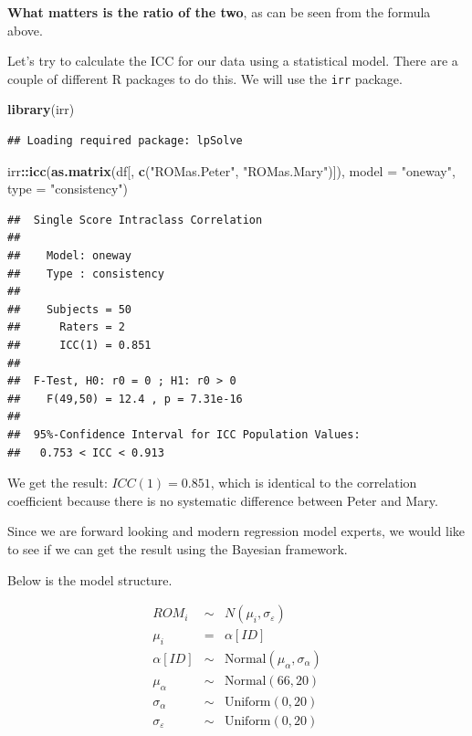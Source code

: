 \documentclass[
]{book}
\newenvironment{Shaded}{\begin{snugshade}}{\end{snugshade}}
\newcommand{\AttributeTok}[1]{\textcolor[rgb]{0.13,0.29,0.53}{#1}}
\newcommand{\FunctionTok}[1]{\textcolor[rgb]{0.13,0.29,0.53}{\textbf{#1}}}
\newcommand{\NormalTok}[1]{#1}
\newcommand{\SpecialCharTok}[1]{\textcolor[rgb]{0.81,0.36,0.00}{\textbf{#1}}}
\newcommand{\StringTok}[1]{\textcolor[rgb]{0.31,0.60,0.02}{#1}}
\begin{document}
\textbf{What matters is the ratio of the two}, as can be seen from the formula above.

Let's try to calculate the ICC for our data using a statistical model. There are a couple of different
R packages to do this. We will use the \texttt{irr} package.

\begin{Shaded}
\begin{Highlighting}[]
\FunctionTok{library}\NormalTok{(irr)}
\end{Highlighting}
\end{Shaded}

\begin{verbatim}
## Loading required package: lpSolve
\end{verbatim}

\begin{Shaded}
\begin{Highlighting}[]
\NormalTok{irr}\SpecialCharTok{::}\FunctionTok{icc}\NormalTok{(}\FunctionTok{as.matrix}\NormalTok{(df[, }\FunctionTok{c}\NormalTok{(}\StringTok{"ROMas.Peter"}\NormalTok{, }\StringTok{"ROMas.Mary"}\NormalTok{)]), }
    \AttributeTok{model =} \StringTok{"oneway"}\NormalTok{, }\AttributeTok{type =} \StringTok{"consistency"}\NormalTok{)}
\end{Highlighting}
\end{Shaded}

\begin{verbatim}
##  Single Score Intraclass Correlation
## 
##    Model: oneway 
##    Type : consistency 
## 
##    Subjects = 50 
##      Raters = 2 
##      ICC(1) = 0.851
## 
##  F-Test, H0: r0 = 0 ; H1: r0 > 0 
##    F(49,50) = 12.4 , p = 7.31e-16 
## 
##  95%-Confidence Interval for ICC Population Values:
##   0.753 < ICC < 0.913
\end{verbatim}

We get the result: \(ICC(1) = 0.851\), which is identical to the correlation coefficient
because there is no systematic difference between Peter and Mary.

Since we are forward looking and modern regression model experts,
we would like to see if we can get the result using the Bayesian
framework.

Below is the model structure.

\[
\begin{array}{rcl}
ROM_i &\sim& N(\mu_i, \sigma_{\varepsilon}) \\
\mu_i &=& \alpha[ID] \\
\alpha[ID] &\sim& \text{Normal}(\mu_{\alpha}, \sigma_{\alpha}) \\
\mu_{\alpha} &\sim& \text{Normal}(66, 20) \\
\sigma_{\alpha} &\sim& \text{Uniform}(0,20) \\
\sigma_{\varepsilon} &\sim& \text{Uniform}(0,20)
\end{array}
\]
\end{document}
